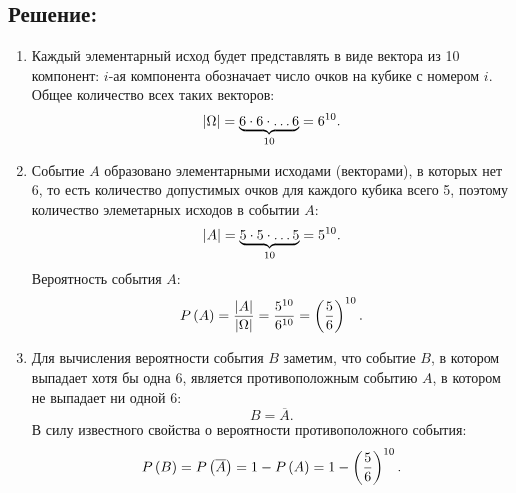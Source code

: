 \subsection*{Решение:}
\begin{enumerate}
    \item
    Каждый элементарный исход будет представлять в виде вектора из 10 компонент: $i$-ая компонента обозначает число очков на кубике с номером $i$.
    Общее количество всех таких векторов:
    \begin{equation}
        \left | \Omega \right | = \underbrace{6 \cdot 6 \cdot \dots 6}_{10} = 6^{10}.
    \end{equation}

    \item
    Событие $A$ образовано элементарными исходами (векторами), в которых нет 6, то есть количество допустимых очков для каждого кубика всего 5,
    поэтому количество элеметарных исходов в событии $A$:
    \begin{equation}
        \left | A \right | = \underbrace{5 \cdot 5 \cdot \dots 5}_{10} = 5^{10}.
    \end{equation}
    Вероятность события $A$:
    \begin{equation}
        P \left ( A \right )
        = \frac{\left | A \right |}{\left | \Omega \right |}
        = \frac{5^{10}}{6^{10}}
        = \left ( \frac{5}{6} \right )^{10} .
    \end{equation}

    \item
    Для вычисления вероятности события $B$ заметим, что событие $B$, в котором выпадает хотя бы одна 6, является противоположным событию $A$,
    в котором не выпадает ни одной 6:
    \begin{equation}
        B = \overline{A} .
    \end{equation}
    В силу известного свойства о вероятности противоположного события:
    \begin{equation}
        P \left ( B \right ) = P \left ( \overline{A} \right ) = 1 - P \left ( A \right ) = 1 - \left ( \frac{5}{6} \right )^{10} .
    \end{equation}


\end{enumerate}
